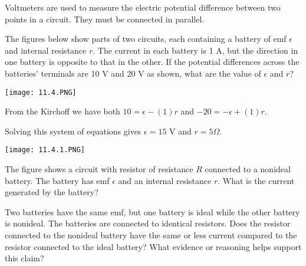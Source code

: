 \documentclass[../em.tex]{subfiles}
\begin{document}
Voltmeters are used to measure the electric potential difference between two points in a circuit. They must be connected in parallel.

\begin{example}
    The figures below show parts of two circuits, each containing a battery of emf $\epsilon$ and internal resistance $r$. The current in each battery is 1 A, but the direction in one battery 
    is opposite to that in the other. If the potential differences across the batteries' terminals are 10 V and 20 V as shown, what are the value of $\epsilon$ and $r$?

    \begin{center}
        \texttt{[image: 11.4.PNG]}
    \end{center}

    From the Kirchoff we have both $10=\epsilon-(1)r$ and $-20=-\epsilon+(1)r$.

    Solving this system of equations gives $\epsilon = 15$ V and $r = 5 \Omega$.   
\end{example}

\ex \begin{center}
    \texttt{[image: 11.4.1.PNG]}
\end{center}
The figure shows a circuit with resistor of resistance $R$ connected to a nonideal battery. The battery has emf $\epsilon$ and an internal resistance $r$. What is the current generated by the battery?

\ex Two batteries have the same emf, but one battery is ideal while the other battery is nonideal. The batteries are connected to identical resistors. Does the resistor connected to the nonideal battery 
have the same or less current compared to the resistor connected to the ideal battery? What evidence or reasoning helps support this claim?

\pagebreak
\end{document}

